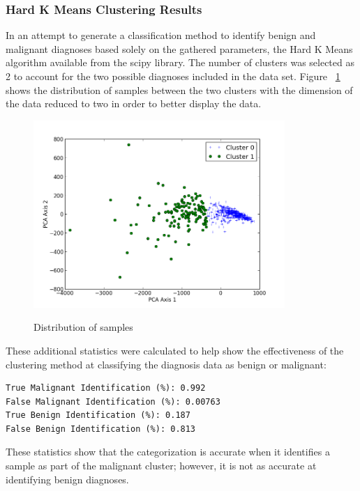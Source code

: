 \documentclass{article}
\begin{document}
\subsubsection*{Hard K Means Clustering Results}
In an attempt to generate a classification method to identify benign and 
malignant diagnoses based solely on the gathered parameters, the Hard K Means
algorithm available from the scipy library. The number of clusters was selected
as 2 to account for the two possible diagnoses included in the data set.
Figure ~\ref{fig:f0} shows the distribution of samples between the two clusters
with the dimension of the data reduced to two in order to better display the data.
\begin{figure}[h!]
\caption{Distribution of samples}
  \centering
    \includegraphics[width=0.85\textwidth]{figure_0.png}
  \label{fig:f0}
\end{figure}
These additional statistics were calculated to help show the effectiveness of 
the clustering method at classifying the diagnosis data as benign or malignant:
\vspace*{1\baselineskip}      
\begin{verbatim}
True Malignant Identification (%): 0.992
False Malignant Identification (%): 0.00763
True Benign Identification (%): 0.187
False Benign Identification (%): 0.813
\end{verbatim}
\vspace*{1\baselineskip}      
These statistics show that the categorization is accurate when it identifies 
a sample as part of the malignant cluster; however, it is not as accurate at identifying benign diagnoses.
\end{document}
